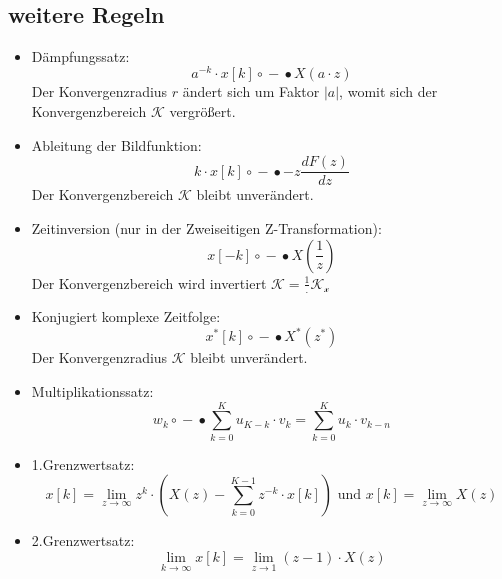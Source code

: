 \documentclass[11pt]{article}
\providecommand{\tightlist}{%
      \setlength{\itemsep}{0pt}\setlength{\parskip}{0pt}}
\begin{document}
    \begin{center}
    \end{center}
    { \hspace*{\fill} \\}
    
    \subsection{weitere Regeln}\label{weitere-regeln}

\begin{itemize}
\tightlist
\item
  Dämpfungssatz:
  \[a^{-k} \cdot x[k] \circ \!\!-\!\!\bullet X(a \cdot z)\] Der
  Konvergenzradius \(r\) ändert sich um Faktor \(|a|\), womit sich der
  Konvergenzbereich \(\mathcal{K}\) vergrößert.
\end{itemize}

    \begin{itemize}
\tightlist
\item
  Ableitung der Bildfunktion:
  \[k \cdot x[k] \circ \!\!-\!\!\bullet -z \frac{dF(z)}{dz}\] Der
  Konvergenzbereich \(\mathcal{K}\) bleibt unverändert.
\end{itemize}

    \begin{itemize}
\tightlist
\item
  Zeitinversion (nur in der Zweiseitigen Z-Transformation):
  \[x[-k] \circ \!\!-\!\!\bullet X(\frac{1}{z})\] Der Konvergenzbereich
  wird invertiert \(\mathcal{K} = \frac{1}.{\mathcal{K_x}}\)
\end{itemize}

    \begin{itemize}
\tightlist
\item
  Konjugiert komplexe Zeitfolge:
  \[x^{*}[k] \circ \!\!-\!\!\bullet X^{*}(z^{*})\] Der Konvergenzradius
  \(\mathcal{K}\) bleibt unverändert.
\end{itemize}

    \begin{itemize}
\tightlist
\item
  Multiplikationssatz:
  \[w_k \circ \!\!-\!\!\bullet \sum_{k=0}^K u_{K-k} \cdot v_k = \sum_{k=0}^K u_{k} \cdot v_{k-n}\]
\end{itemize}

    \begin{itemize}
\item
  1.Grenzwertsatz:
  \[x[k] = \lim_{z\to\infty} z^k \cdot (X(z) - \sum_{k=0}^{K-1} z^{-k} \cdot x[k]) \textrm{ und } x[k] = \lim_{z\to\infty} X(z)\]
\item
  2.Grenzwertsatz:
  \[\lim_{k\to\infty} x[k] = \lim_{z\to 1} (z-1)\cdot X(z)\]
\end{itemize}
\end{document}
